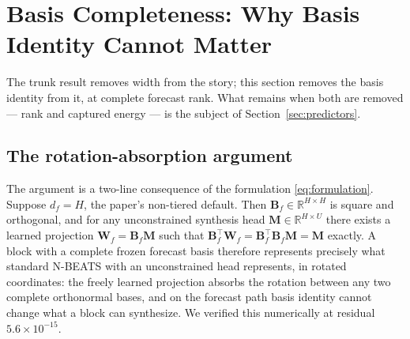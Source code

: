 %

\section{Basis Completeness: Why Basis Identity Cannot Matter}
\label{sec:completeness}

The trunk result removes width from the story; this section removes the
basis identity from it, at complete forecast rank. What remains when both
are removed --- rank and captured energy --- is the subject of
Section~\ref{sec:predictors}.

\subsection{The rotation-absorption argument}
\label{sec:completeness:proof}

The argument is a two-line consequence of the formulation
\eqref{eq:formulation}. Suppose $d_f = H$, the paper's non-tiered
default. Then $\mathbf{B}_f \in \mathbb{R}^{H \times H}$ is square and
orthogonal, and for any unconstrained synthesis head
$\mathbf{M} \in \mathbb{R}^{H \times U}$ there exists a learned projection
$\mathbf{W}_f = \mathbf{B}_f \mathbf{M}$ such that
$\mathbf{B}_f^{\top} \mathbf{W}_f = \mathbf{B}_f^{\top}
\mathbf{B}_f \mathbf{M} = \mathbf{M}$ exactly. A block with a complete
frozen forecast basis therefore represents precisely what standard N-BEATS
with an unconstrained head represents, in rotated coordinates: the freely
learned projection absorbs the rotation between any two complete
orthonormal bases, and on the forecast path basis identity cannot change
what a block can synthesize. We verified this numerically at residual
$5.6\times10^{-15}$.

